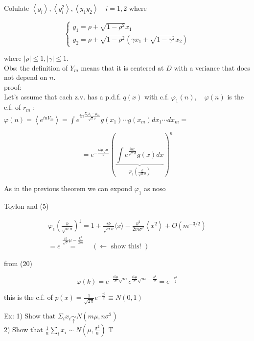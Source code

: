 \documentclass[10pt]{article}
\begin{document}
Colulate $\left\langle y_{i}\right\rangle,\left\langle y_{i}^{2}\right\rangle,\left\langle y_{1} y_{2}\right\rangle \quad i=1,2$ where

$$
\left\{\begin{array}{l}
y_{1}=\rho+\sqrt{1-\rho^{2}} x_{1} \\
y_{2}=\rho+\sqrt{1-\rho^{2}}\left(\gamma x_{1}+\sqrt{1-\gamma^{2}} x_{2}\right)
\end{array}\right.
$$

where $|\rho| \leqslant 1,|\gamma| \leqslant 1$.\\
Obs: the definition of $Y_{m}$ means that it is centered at $D$ with a veriance that does not depend on $n$.\\
proof:\\
Let's assume that cach z.v. has a p.d.f. $q(x)$ with c.f. $\varphi_{1}(n), \quad \varphi(n)$ is the c.f. of $r_{m}$ :\\
$\varphi(n)=\left\langle e^{i n V_{m}}\right\rangle=\int e^{i n \frac{\Sigma_{i} x_{i}-\mu_{m}}{\sqrt{\pi} \sigma}} g\left(x_{1}\right) \cdots g\left(x_{m}\right) d x_{1} \cdots d x_{m}=$


\begin{equation*}
=e^{-\frac{i k \mu \sqrt{n}}{\sigma}}(\underbrace{\int e^{\frac{i n x}{\sqrt{n} \sigma}} g(x) d x}_{\varphi_{1}\left(\frac{k}{\sqrt{n} \sigma}\right)})^{n} \tag{20}
\end{equation*}


As in the previous theorem we can expond $\varphi_{1}$ as noso

Toylon and (5)

$$
\begin{gathered}
\varphi_{1}\left(\frac{k}{\sqrt{n} \sigma}\right)^{\downarrow}=1+\frac{i k}{\sqrt{n} \sigma}\langle x\rangle-\frac{k^{2}}{2 m \sigma^{2}}\left\langle x^{2}\right\rangle+O\left(m^{-3 / 2}\right) \\
=e \stackrel{\frac{i k}{\sqrt{\sigma}} \mu-\frac{k^{2}}{2 m}}{=} \quad(\leftarrow \text { show this! })
\end{gathered}
$$

from (20)

$$
\varphi(k)=e^{-\frac{i k \mu}{\sigma} \sqrt{m}} e^{\frac{i k \mu}{\sigma} \sqrt{m}-\frac{k^{2}}{2}}=e^{-\frac{k^{2}}{2}}
$$

this is the c.f. of $p(x)=\frac{1}{\sqrt{2 \pi}} e^{-\frac{x^{2}}{2}} \equiv N(0,1)$

Ex: 1) Show that $\Sigma_{i} x_{i} \underset{\uparrow}{\sim} N\left(m \mu, n \sigma^{2}\right)$\\
2) Show that $\frac{1}{n} \sum_{i} x_{i} \sim N\left(\mu, \frac{\sigma^{2}}{n}\right)$ T
\end{document}

